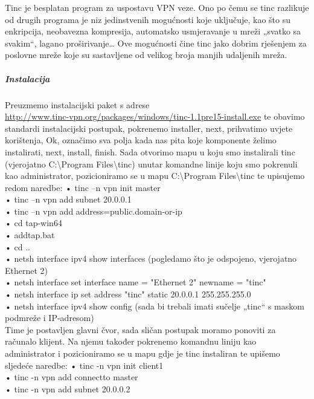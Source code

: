 \hfill \smallbreak
Tinc je besplatan program za uspostavu VPN veze. Ono po čemu se tinc razlikuje od drugih programa je niz jedinstvenih mogućnosti koje uključuje, kao što su enkripcija, neobavezna kompresija, automatsko usmjeravanje u mreži „svatko sa svakim“, lagano proširivanje… Ove mogućnosti čine tinc jako dobrim rješenjem za poslovne mreže koje su sastavljene od velikog broja manjih udaljenih mreža.

\subparagraph{Instalacija}
\hfill \smallbreak
Preuzmemo instalacijski paket s adrese\\ 
\url{http://www.tinc-vpn.org/packages/windows/tinc-1.1pre15-install.exe} te obavimo standardi instalacijski postupak, pokrenemo installer, next, prihvatimo uvjete korištenja, Ok, označimo sva polja kada nas pita koje komponente želimo instalirati, next, install, finish. Sada otvorimo mapu u koju smo instalirali tinc (vjerojatno C:\textbackslash Program Files\textbackslash tinc) unutar komandne linije koju smo pokrenuli kao administrator, pozicioniramo se u mapu C:\textbackslash Program Files\textbackslash tinc te upisujemo redom naredbe:
\FloatBarrier
\smallbreak •	tinc –n vpn init master\\
\smallbreak •	tinc –n vpn add subnet 20.0.0.1\\
\smallbreak •	tinc –n vpn add address=public.domain-or-ip\\
\smallbreak •	cd tap-win64\\
\smallbreak •	addtap.bat\\
\smallbreak •	cd ..\\
\smallbreak •	netsh interface ipv4 show interfaces    (pogledamo što je odspojeno, vjerojatno Ethernet 2)\\
\smallbreak •	netsh interface set interface name = "Ethernet 2" newname = "tinc"\\
\smallbreak •	netsh interface ip set address "tinc" static 20.0.0.1    255.255.255.0\\
\smallbreak •	netsh interface ipv4 show config  (sada bi trebali imati sučelje „tinc“ s maskom podmreže i IP-adresom)\\
\FloatBarrier
Time je postavljen glavni čvor, sada sličan postupak moramo ponoviti za računalo klijent. Na njemu također pokrenemo komandnu liniju kao administrator i pozicioniramo se u mapu gdje je tinc instaliran te upišemo sljedeće naredbe:
\FloatBarrier
\smallbreak •	tinc -n vpn init client1\\
\smallbreak •	tinc -n vpn add connectto master\\
\smallbreak •	tinc -n vpn add subnet 20.0.0.2\\
